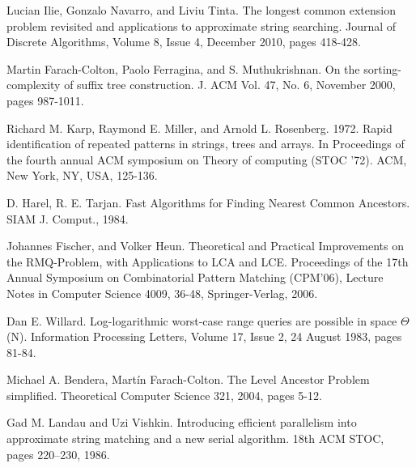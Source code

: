 \documentclass[a4]{article}
\begin{document}
\begin{thebibliography}{9}

 Lucian Ilie, Gonzalo Navarro, and Liviu Tinta. The longest common extension problem revisited and applications to approximate string searching. Journal of Discrete Algorithms, Volume 8, Issue 4, December 2010, pages 418-428.


 Martin Farach-Colton, Paolo Ferragina, and S. Muthukrishnan. On the sorting-complexity of suffix tree construction. J. ACM Vol. 47, No. 6, November 2000, pages 987-1011.

 Richard M. Karp, Raymond E. Miller, and Arnold L. Rosenberg. 1972. Rapid identification of repeated patterns in strings, trees and arrays. In Proceedings of the fourth annual ACM symposium on Theory of computing (STOC '72). ACM, New York, NY, USA, 125-136.

 D. Harel, R. E. Tarjan. Fast Algorithms for Finding Nearest Common Ancestors. SIAM J. Comput., 1984.

 Johannes Fischer, and Volker Heun. Theoretical and Practical Improvements on the RMQ-Problem, with Applications to LCA and LCE. Proceedings of the 17th Annual Symposium on Combinatorial Pattern Matching (CPM'06), Lecture Notes in Computer Science 4009, 36-48, Springer-Verlag, 2006.

 Dan E. Willard. Log-logarithmic worst-case range queries are possible in space $\Theta$(N). Information Processing Letters, Volume 17, Issue 2, 24 August 1983, pages 81-84.

 Michael A. Bendera, Martín Farach-Colton. The Level Ancestor Problem simplified. Theoretical Computer Science 321, 2004, pages 5-12.

 Gad M. Landau and Uzi Vishkin. Introducing efficient parallelism into approximate string matching and a new serial algorithm. 18th ACM STOC, pages 220–230, 1986.

\end{thebibliography}
\end{document}
